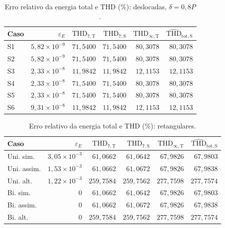 \begin{table}[H]
\centering
\footnotesize\setlength{\tabcolsep}{2pt}
\caption{Erro relativo da energia total e THD (\%): deslocadas, $\delta=0{,}8P$.}\label{tab:thd3}
\begin{tabular}{lrrrrr}\hline
Caso & $\varepsilon_E$ & $\mathrm{THD}_{7,\mathrm T}$ & $\mathrm{THD}_{7,\mathrm S}$ & $\mathrm{THD}_{\infty,\mathrm T}$ & $\widehat{\mathrm{THD}}_{\mathrm{tot},\mathrm S}$ \\ \hline
S1 & $5{,}82\!\times\!10^{-9}$ & $71{,}5400$ & $71{,}5400$ & $80{,}3078$ & $80{,}3078$ \\
S2 & $5{,}82\!\times\!10^{-9}$ & $71{,}5400$ & $71{,}5400$ & $80{,}3078$ & $80{,}3078$ \\
S3 & $2{,}33\!\times\!10^{-8}$ & $11{,}9842$ & $11{,}9842$ & $12{,}1153$ & $12{,}1153$ \\
S4 & $2{,}33\!\times\!10^{-8}$ & $71{,}5400$ & $71{,}5400$ & $80{,}3078$ & $80{,}3078$ \\
S5 & $2{,}33\!\times\!10^{-8}$ & $71{,}5400$ & $71{,}5400$ & $80{,}3078$ & $80{,}3078$ \\
S6 & $9{,}31\!\times\!10^{-8}$ & $11{,}9842$ & $11{,}9842$ & $12{,}1153$ & $12{,}1153$ \\
\hline\end{tabular}
\end{table}
\begin{table}[H]
\centering
\footnotesize\setlength{\tabcolsep}{2pt}
\caption{Erro relativo da energia total e THD (\%): retangulares.}\label{tab:thd4}
\begin{tabular}{lrrrrr}\hline
Caso & $\varepsilon_E$ & $\mathrm{THD}_{7,\mathrm T}$ & $\mathrm{THD}_{7,\mathrm S}$ & $\mathrm{THD}_{\infty,\mathrm T}$ & $\widehat{\mathrm{THD}}_{\mathrm{tot},\mathrm S}$ \\ \hline
Uni. sim. & $3{,}05\!\times\!10^{-3}$ & $61{,}0662$ & $61{,}0642$ & $67{,}9826$ & $67{,}9803$ \\
Uni. assim. & $1{,}53\!\times\!10^{-3}$ & $61{,}0662$ & $61{,}0672$ & $67{,}9826$ & $67{,}9838$ \\
Uni. alt. & $1{,}22\!\times\!10^{-3}$ & $259{,}7584$ & $259{,}7562$ & $277{,}7598$ & $277{,}7574$ \\
Bi. sim. & $0$ & $61{,}0662$ & $61{,}0642$ & $67{,}9826$ & $67{,}9803$ \\
Bi. assim. & $0$ & $61{,}0662$ & $61{,}0672$ & $67{,}9826$ & $67{,}9838$ \\
Bi. alt. & $0$ & $259{,}7584$ & $259{,}7562$ & $277{,}7598$ & $277{,}7574$ \\
\hline\end{tabular}
\end{table}
